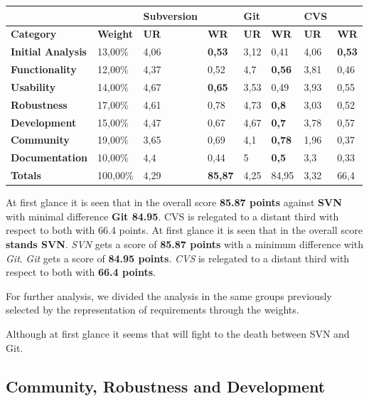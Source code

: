 \documentclass[11pt]{scrartcl}
\begin{document}
\begin{tabular}{|l|l|l|l|l|l|l|l|}
    \hline
     &  & {\bf Subversion} &   & {\bf Git} &  & {\bf CVS} &  \\
    \hline
    {\bf Category} & {\bf Weight} & {\bf UR} & {\bf WR} & {\bf UR} & {\bf WR} & {\bf UR} & {\bf WR}\\
    \hline
    {\bf Initial Analysis} & 13,00\% & 4,06 & {\bf 0,53} & 3,12 & 0,41 & 4,06 & {\bf 0,53}\\
    \hline
    {\bf Functionality} & 12,00\% & 4,37 & 0,52 & 4,7 & {\bf 0,56} & 3,81 & 0,46\\
    \hline
    {\bf Usability} & 14,00\% & 4,67 & {\bf 0,65} & 3,53 & 0,49 & 3,93 & 0,55\\
    \hline
    {\bf Robustness} & 17,00\% & 4,61 & 0,78 & 4,73 & {\bf 0,8} & 3,03 & 0,52\\
    \hline
    {\bf Development} & 15,00\% & 4,47 & 0,67 & 4,67 & {\bf 0,7} & 3,78 & 0,57\\
    \hline
    {\bf Community} & 19,00\% & 3,65 & 0,69 & 4,1 & {\bf 0,78} & 1,96 & 0,37\\
    \hline
    {\bf Documentation} & 10,00\% & 4,4 & 0,44 & 5 & {\bf 0,5} & 3,3 & 0,33\\
    \hline
    {\bf Totals} & 100,00\% & 4,29 & {\bf 85,87} & 4,25 & 84,95 & 3,32 & 66,4\\
    \hline
\end{tabular}

\par At first glance it is seen that in the overall score \textbf{85.87 points} against \textbf{SVN} with minimal difference \textbf{Git 84.95}. CVS is relegated to a distant third with respect to both with 66.4 points.
At first glance it is seen that in the overall score \textbf{stands SVN}. \emph{SVN} gets a score of \textbf{85.87 points} with a minimum difference with \emph{Git}. \emph{Git} gets a score of \textbf{84.95 points}. \emph{CVS} is relegated to a distant third with respect to both with \textbf{66.4 points}.

\par For further analysis, we divided the analysis in the same groups previously selected by the representation of requirements through the weights.

\par Although at first glance it seems that will fight to the death between SVN and Git.

\subsection{Community, Robustness and Development}
\end{document}

